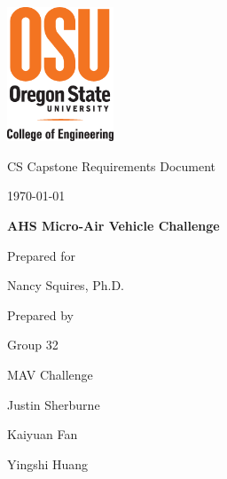 \documentclass[onecolumn, draftclsnofoot,10pt, compsoc]{IEEEtran}
\def \CapstoneTeamName{		MAV Challenge}
\def \CapstoneTeamNumber{		32}
\def \GroupMemberOne{			Justin Sherburne}
\def \GroupMemberTwo{			Kaiyuan Fan}
\def \GroupMemberThree{			Yingshi Huang}
\def \CapstoneProjectName{		AHS Micro-Air Vehicle Challenge}
\def \CapstoneSponsorPerson{		Nancy Squires, Ph.D.}
\def \DocType{		%
				Requirements Document
				}
\newcommand{\NameSigPair}[1]{\par
\makebox[2.75in][r]{#1} \hfil 	\makebox[3.25in]{\makebox[2.25in]{\hrulefill} \hfill		\makebox[.75in]{\hrulefill}}
\par\vspace{-12pt} \textit{\tiny\noindent
\makebox[2.75in]{} \hfil		\makebox[3.25in]{\makebox[2.25in][r]{Signature} \hfill	\makebox[.75in][r]{Date}}}}
\renewcommand{\NameSigPair}[1]{#1}
\begin{document}
\begin{titlepage}
    \begin{singlespace}
    	\includegraphics[height=4cm]{coe_v_spot1}
        \hfill 
        \par\vspace{.2in}
        \centering
        \scshape{
            \huge CS Capstone \DocType \par
            {\large\today}\par
            \vspace{8pt}
            \textbf{\Huge\CapstoneProjectName}\par
			\vspace{1.5in}
            {\large Prepared for}\par
            {\Large\NameSigPair{\CapstoneSponsorPerson}\par}
			\vspace{3pt}
            {\large Prepared by }\par
            Group\CapstoneTeamNumber\par
            \CapstoneTeamName\par 
            \vspace{8pt}
            {\Large
                \NameSigPair{\GroupMemberOne}\par
                \NameSigPair{\GroupMemberTwo}\par
                \NameSigPair{\GroupMemberThree}\par
            }
            \vspace{.5in}
        }
        \begin{abstract}
        This document is intended to define project specifications and requirements. It contains a statement of what requirements need to be met for MAV challenge, how the aircraft works, and technologies and software are used to operate the control board. This document will also include proposed solutions for various challenges, as well as project constraints. It is intended for project sponsors, collaborators, or as a resource to future projects of a similar nature.
        \end{abstract}     
    \end{singlespace}
\end{titlepage}
\newpage
{}
\tableofcontents
\listoffigures
\clearpage
\end{document}
